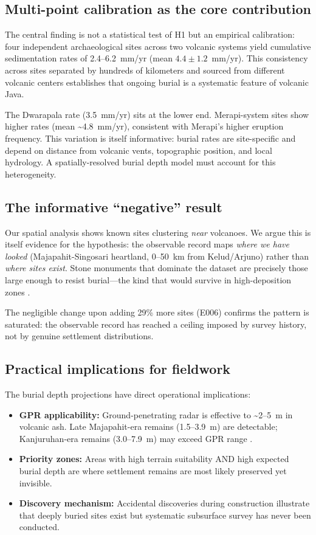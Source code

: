 \documentclass[12pt,a4paper]{article}
\begin{document}
\subsection{Multi-point calibration as the core contribution}

The central finding is not a statistical test of H1 but an empirical calibration: four independent archaeological sites across two volcanic systems yield cumulative sedimentation rates of 2.4--6.2~mm/yr (mean $4.4 \pm 1.2$~mm/yr). This consistency across sites separated by hundreds of kilometers and sourced from different volcanic centers establishes that ongoing burial is a systematic feature of volcanic Java.

The Dwarapala rate (3.5~mm/yr) sits at the lower end. Merapi-system sites show higher rates (mean \textasciitilde4.8~mm/yr), consistent with Merapi's higher eruption frequency. This variation is itself informative: burial rates are site-specific and depend on distance from volcanic vents, topographic position, and local hydrology. A spatially-resolved burial depth model must account for this heterogeneity.

\subsection{The informative ``negative'' result}

Our spatial analysis shows known sites clustering \textit{near} volcanoes. We argue this is itself evidence for the hypothesis: the observable record maps \textit{where we have looked} (Majapahit-Singosari heartland, 0--50~km from Kelud/Arjuno) rather than \textit{where sites exist}. Stone monuments that dominate the dataset are precisely those large enough to resist burial---the kind that would survive in high-deposition zones \citep{verhagen2012}.

The negligible change upon adding 29\% more sites (E006) confirms the pattern is saturated: the observable record has reached a ceiling imposed by survey history, not by genuine settlement distributions.

\subsection{Practical implications for fieldwork}

The burial depth projections have direct operational implications:

\begin{itemize}
  \item \textbf{GPR applicability:} Ground-penetrating radar is effective to \textasciitilde2--5~m in volcanic ash. Late Majapahit-era remains (1.5--3.9~m) are detectable; Kanjuruhan-era remains (3.0--7.9~m) may exceed GPR range \citep{conyers2004}.
  \item \textbf{Priority zones:} Areas with high terrain suitability AND high expected burial depth are where settlement remains are most likely preserved yet invisible.
  \item \textbf{Discovery mechanism:} Accidental discoveries during construction illustrate that deeply buried sites exist but systematic subsurface survey has never been conducted.
\end{itemize}
\end{document}
